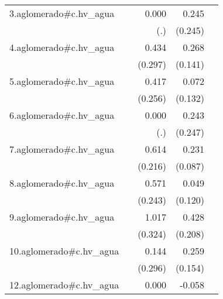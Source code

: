 {\begin{longtable}{l*{4}{D{.}{.}{-1}}}
\addlinespace
3.aglomerado#c.hv\_agua&                     &       0.000         &       0.245         &                     \\
            &                     &         (.)         &     (0.245)         &                     \\
\addlinespace
4.aglomerado#c.hv\_agua&                     &       0.434         &       0.268         &                     \\
            &                     &     (0.297)         &     (0.141)         &                     \\
\addlinespace
5.aglomerado#c.hv\_agua&                     &       0.417         &       0.072         &                     \\
            &                     &     (0.256)         &     (0.132)         &                     \\
\addlinespace
6.aglomerado#c.hv\_agua&                     &       0.000         &       0.243         &                     \\
            &                     &         (.)         &     (0.247)         &                     \\
\addlinespace
7.aglomerado#c.hv\_agua&                     &       0.614\sym{**} &       0.231\sym{**} &                     \\
            &                     &     (0.216)         &     (0.087)         &                     \\
\addlinespace
8.aglomerado#c.hv\_agua&                     &       0.571\sym{*}  &       0.049         &                     \\
            &                     &     (0.243)         &     (0.120)         &                     \\
\addlinespace
9.aglomerado#c.hv\_agua&                     &       1.017\sym{**} &       0.428\sym{*}  &                     \\
            &                     &     (0.324)         &     (0.208)         &                     \\
\addlinespace
10.aglomerado#c.hv\_agua&                     &       0.144         &       0.259         &                     \\
            &                     &     (0.296)         &     (0.154)         &                     \\
\addlinespace
12.aglomerado#c.hv\_agua&                     &       0.000         &      -0.058         &                     \\

\end{longtable}}
